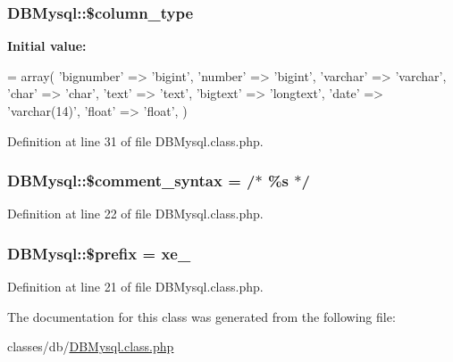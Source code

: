 \subsubsection[{\$column\+\_\+type}]{\setlength{\rightskip}{0pt plus 5cm}D\+B\+Mysql\+::\$column\+\_\+type}\label{classDBMysql_aa93c8f5f14304a16864a0708a3ba41b0}
{\bfseries Initial value\+:}
\begin{DoxyCode}
= array(
        \textcolor{stringliteral}{'bignumber'} => \textcolor{stringliteral}{'bigint'},
        \textcolor{stringliteral}{'number'} => \textcolor{stringliteral}{'bigint'},
        \textcolor{stringliteral}{'varchar'} => \textcolor{stringliteral}{'varchar'},
        \textcolor{stringliteral}{'char'} => \textcolor{stringliteral}{'char'},
        \textcolor{stringliteral}{'text'} => \textcolor{stringliteral}{'text'},
        \textcolor{stringliteral}{'bigtext'} => \textcolor{stringliteral}{'longtext'},
        \textcolor{stringliteral}{'date'} => \textcolor{stringliteral}{'varchar(14)'},
        \textcolor{stringliteral}{'float'} => \textcolor{stringliteral}{'float'},
    )
\end{DoxyCode}


Definition at line 31 of file D\+B\+Mysql.\+class.\+php.

\hypertarget{classDBMysql_a2c00f6e29c9e4fc4a532f806cf4313c2}{}
\subsubsection[{\$comment\+\_\+syntax}]{\setlength{\rightskip}{0pt plus 5cm}D\+B\+Mysql\+::\$comment\+\_\+syntax = \textquotesingle{}/$\ast$ \%s $\ast$/\textquotesingle{}}\label{classDBMysql_a2c00f6e29c9e4fc4a532f806cf4313c2}


Definition at line 22 of file D\+B\+Mysql.\+class.\+php.

\hypertarget{classDBMysql_ac95b2047c4c75730e0533be0cccd19d9}{}
\subsubsection[{\$prefix}]{\setlength{\rightskip}{0pt plus 5cm}D\+B\+Mysql\+::\$prefix = \textquotesingle{}xe\+\_\+\textquotesingle{}}\label{classDBMysql_ac95b2047c4c75730e0533be0cccd19d9}


Definition at line 21 of file D\+B\+Mysql.\+class.\+php.



The documentation for this class was generated from the following file\+:\begin{DoxyCompactItemize}
\item 
classes/db/\hyperlink{DBMysql_8class_8php}{D\+B\+Mysql.\+class.\+php}\end{DoxyCompactItemize}

